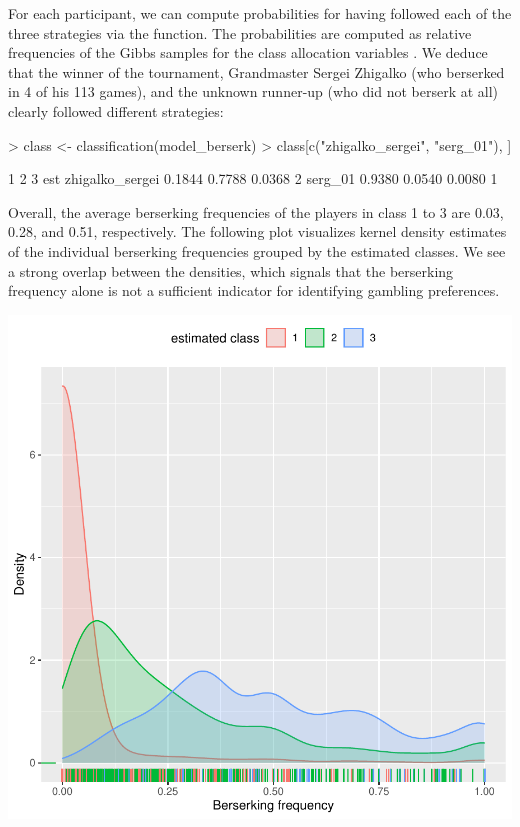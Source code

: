 \documentclass[article,shortnames]{jss}
\newcommand{\fct}[1]{\code{#1()}}
\begin{document}
\newpage

For each participant, we can compute probabilities for having followed each of the three strategies via the \fct{classification} function. The probabilities are computed as relative frequencies of the Gibbs samples for the class allocation variables . We deduce that the winner of the tournament, Grandmaster Sergei Zhigalko (who berserked in 4 of his 113 games), and the unknown runner-up (who did not berserk at all) clearly followed different strategies:

\begin{Schunk}
\begin{Sinput}
> class <- classification(model_berserk)
> class[c("zhigalko_sergei", "serg_01"), ]
\end{Sinput}
\begin{Soutput}
                     1      2      3 est
zhigalko_sergei 0.1844 0.7788 0.0368   2
serg_01         0.9380 0.0540 0.0080   1
\end{Soutput}
\end{Schunk}

Overall, the average berserking frequencies of the players in class 1 to 3 are 0.03, 0.28, and
0.51, respectively. The following plot visualizes kernel density estimates of the individual berserking frequencies grouped by the estimated classes. We see a strong overlap between the densities, which signals that the berserking frequency alone is not a sufficient indicator for identifying gambling preferences.

\includegraphics{rprobitb_oelschlaeger_bauer-berserk-freq}
\end{document}
